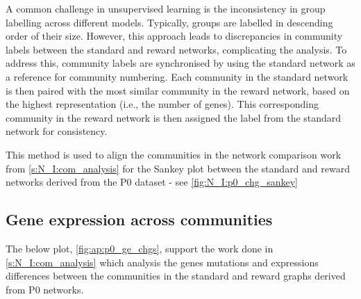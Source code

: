 A common challenge in unsupervised learning is the inconsistency in group labelling across different models. Typically, groups are labelled in descending order of their size. However, this approach leads to discrepancies in community labels between the standard and reward networks, complicating the analysis. To address this, community labels are synchronised by using the standard network as a reference for community numbering. Each community in the standard network is then paired with the most similar community in the reward network, based on the highest representation (i.e., the number of genes). This corresponding community in the reward network is then assigned the label from the standard network for consistency.

This method is used to align the communities in the network comparison work from \cref{s:N_I:com_analysis} for the Sankey plot between the standard and reward networks derived from the P0 dataset - see \cref{fig:N_I:p0_chg_sankey}

\newpage

\subsection{Gene expression across communities} \label{s:ap:ge_p0_com}

The below plot, \cref{fig:ap:p0_ge_chgs}, support the work done in \cref{s:N_I:com_analysis} which analysis the genes mutations and expressions differences between the communities in the standard and reward graphs derived from P0 networks.

